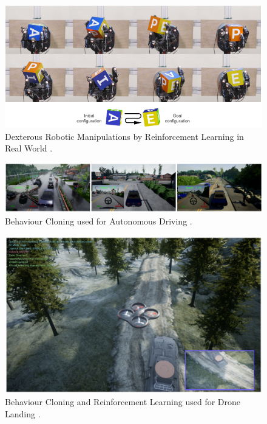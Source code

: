 \begin{figure}[h!]
    \centering
    \includegraphics[width=\textwidth]{images/RRL.png}
    \caption{Dexterous Robotic Manipulations by Reinforcement Learning in Real World \cite{openai2019learning}.}
    \label{fig:RRL}
\end{figure}

\begin{figure}[h!]
    \centering
    \includegraphics[width=\textwidth]{images/BCAD.png}
    \caption{Behaviour Cloning used for Autonomous Driving \cite{codevilla2019exploring}.}
    \label{fig:BCAD}
\end{figure}

\begin{figure}[h!]
    \centering
    \includegraphics[width=\textwidth]{images/BCRL.png}
    \caption{Behaviour Cloning and Reinforcement Learning used for Drone Landing \cite{goecks2020integrating}.}
    \label{fig:BCRL}
\end{figure}

